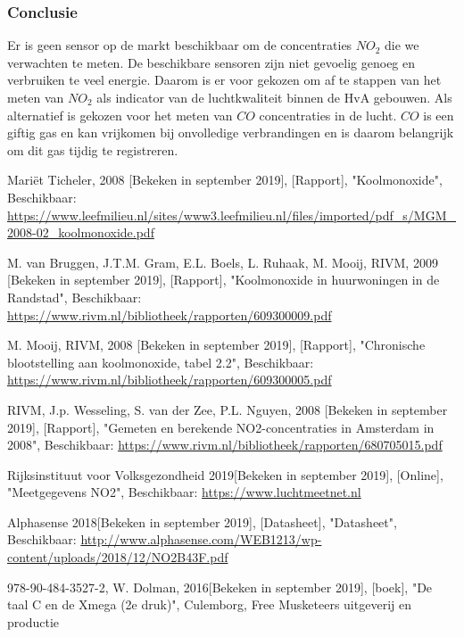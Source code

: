 \documentclass[a4paper, 11pt]{article} %
\begin{document}
	\subsubsection{Conclusie}
	Er is geen sensor op de markt beschikbaar om de concentraties $NO_2$ die we verwachten te meten. De beschikbare sensoren zijn niet gevoelig genoeg en verbruiken te veel energie. Daarom is er voor gekozen om af te stappen van het meten van $NO_2$ als indicator van de luchtkwaliteit binnen de HvA gebouwen. Als alternatief is gekozen voor het meten van $CO$ concentraties in de lucht. $CO$ is een giftig gas en kan vrijkomen bij onvolledige verbrandingen en is daarom belangrijk om dit gas tijdig te registreren.
	\newpage
	
	\begin{thebibliography}{9}
		
		Mariët Ticheler, 
		2008 [Bekeken in september 2019],
		[Rapport],
		"Koolmonoxide",
		Beschikbaar: \url{https://www.leefmilieu.nl/sites/www3.leefmilieu.nl/files/imported/pdf_s/MGM_2008-02_koolmonoxide.pdf}
		
		M. van Bruggen, J.T.M. Gram, E.L. Boels, L. Ruhaak, M. Mooij,
		RIVM,
		2009 [Bekeken in september 2019],
		[Rapport],
		"Koolmonoxide in huurwoningen in de Randstad",
		Beschikbaar: \url{https://www.rivm.nl/bibliotheek/rapporten/609300009.pdf}
		
		M. Mooij,
		RIVM,
		2008 [Bekeken in september 2019],
		[Rapport],
		"Chronische blootstelling aan koolmonoxide, tabel 2.2",
		Beschikbaar: \url{https://www.rivm.nl/bibliotheek/rapporten/609300005.pdf}
		
		RIVM, J.p. Wesseling, S. van der Zee, P.L. Nguyen,
		2008 [Bekeken in september 2019],
		[Rapport],
		"Gemeten en berekende NO2-concentraties in Amsterdam in 2008",
		Beschikbaar: \url{https://www.rivm.nl/bibliotheek/rapporten/680705015.pdf}
		
		Rijksinstituut voor Volksgezondheid
		2019[Bekeken in september 2019],
		[Online],
		"Meetgegevens NO2",
		Beschikbaar: \url{https://www.luchtmeetnet.nl}
		
		Alphasense
		2018[Bekeken in september 2019],
		[Datasheet],
		"Datasheet",
		Beschikbaar: \url{http://www.alphasense.com/WEB1213/wp-content/uploads/2018/12/NO2B43F.pdf}
		
		978-90-484-3527-2,
		W. Dolman,
		2016[Bekeken in september 2019],
		[boek],
		"De taal C en de Xmega (2e druk)",
		Culemborg,
		Free Musketeers uitgeverij en productie
		

\end{thebibliography}
\end{document}
